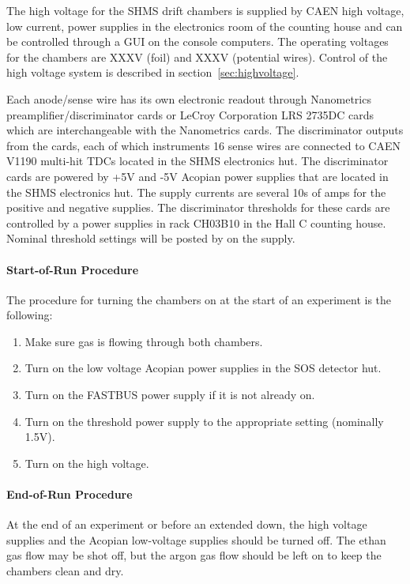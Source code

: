 The high voltage for the SHMS drift chambers is supplied by CAEN
high voltage, low current, power supplies in the electronics room of
the counting
house and can be controlled through a GUI on the console computers.
The operating voltages for the chambers are XXXV (foil) and XXXV
(potential wires).  Control of the high voltage system is described in
section~\ref{sec:highvoltage}.

Each anode/sense wire has its own electronic readout through
Nanometrics preamplifier/discriminator cards or LeCroy Corporation LRS
2735DC cards which are interchangeable with the Nanometrics cards.
The discriminator outputs from the cards, each of which instruments 16
sense wires are connected to CAEN V1190 multi-hit TDCs located in the
SHMS electronics hut.  
The discriminator cards are powered by +5V and -5V Acopian power
supplies that are 
located in the SHMS electronics hut.  The supply currents are several
10s of amps for the positive and negative supplies.
The discriminator thresholds for these cards are controlled by a power
supplies in rack CH03B10 in the Hall C counting house.  Nominal
threshold settings will be posted by on the supply.

\paragraph{Start-of-Run Procedure}
The procedure for turning the chambers on at the start of an
experiment is the following:
\begin{enumerate}
\item Make sure gas is flowing through both chambers.
\item Turn on the low voltage Acopian power supplies in the SOS detector hut.
\item Turn on the FASTBUS power supply if it is not already on.
\item Turn on the threshold power supply to the appropriate setting
  (nominally 1.5V).
\item Turn on the high voltage.
\end{enumerate}

\paragraph{End-of-Run Procedure}
At the end of an experiment or before an extended down, the high
voltage supplies and the Acopian low-voltage supplies should be turned
off.  The ethan gas flow may be shot off, but the argon gas flow
should be left on to keep the chambers clean and dry.


